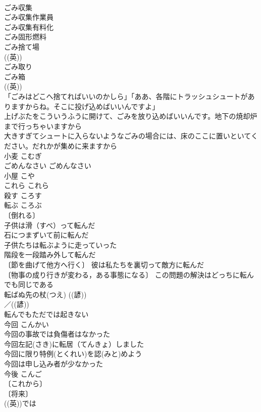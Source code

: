 \documentclass[8pt]{extreport}
\begin{document}
\begin{CJK}{UTF8}{min}
\\	ごみ収集 
\\	ごみ収集作業員 
\\	ごみ収集有料化 
\\	ごみ固形燃料 
\\	ごみ捨て場 
\\	((英)) 
\\	ごみ取り 
\\	ごみ箱 
\\	((英)) 
\\	「ごみはどこへ捨てればいいのかしら」「ああ、各階にトラッシュシュートがありますからね。そこに投げ込めばいいんですよ」 
\\	上げぶたをこういうふうに開けて、ごみを放り込めばいいんです。地下の焼却炉まで行っちゃいますから 
\\	大きすぎてシュートに入らないようなごみの場合には、床のここに置いといてください。だれかが集めに来ますから 
\\	小麦	こむぎ	
\\	ごめんなさい	ごめんなさい	
\\	小屋	こや	
\\	これら	これら	
\\	殺す	ころす	
\\	転ぶ	ころぶ	
\\	〔倒れる〕
\\	子供は滑（すべ）って転んだ 
\\	石につまずいて前に転んだ 
\\	子供たちは転ぶように走っていった 
\\	階段を一段踏み外して転んだ 
\\	〔節を曲げて他方へ行く〕 彼は私たちを裏切って敵方に転んだ 
\\	〔物事の成り行きが変わる，ある事態になる〕 この問題の解決はどっちに転んでも同じである 
\\	転ばぬ先の杖(つえ) ((諺)) 
\\	／((諺)) 
\\	転んでもただでは起きない 
\\	今回	こんかい	
\\	今回の事故では負傷者はなかった 
\\	今回左記(さき)に転居（てんきょ）しました 
\\	今回に限り特例(とくれい)を認(みと)めよう 
\\	今回は申し込み者が少なかった 
\\	今後	こんご	
\\	〔これから〕
\\	〔将来〕
\\	((英))では

\end{CJK}
\end{document}
